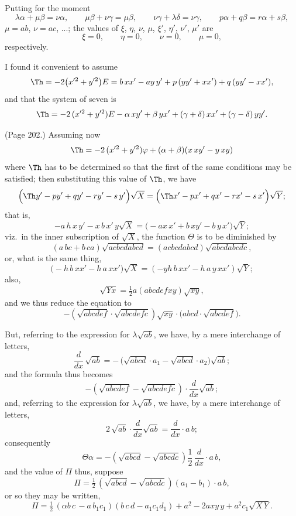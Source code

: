 \documentclass[11pt,a4paper]{book}
\begin{document}
Putting for the moment
\[
\lambda \alpha + \mu \beta = \nu \alpha, \qquad \mu \beta + \nu \gamma = \mu \beta, \qquad \nu \gamma + \lambda \delta = \nu \gamma, \qquad p \alpha + q \beta = r \alpha + s \beta,
\]
$\mu = ab$, $\nu = ac$, ...; the values of $\xi$, $\eta$, $\nu$, $\mu$, $\xi'$, $\eta'$, $\nu'$, $\mu'$ are
\[
\xi = 0, \qquad \eta = 0, \qquad \nu = 0, \qquad \mu = 0,
\]
respectively.

I found it convenient to assume
\[
\Th = -2 \big(x'^2 + y'^2 \big)E = b\,xx' - ay\,y' + p\,(yy' + xx') + q\,(yy' - xx'),
\]
and that the system of seven is
\[
\Th = -2\,(x'^2 + y'^2)E - \alpha\,xy' + \beta\,yx' + (\gamma + \delta)\,xx' + (\gamma - \delta)\,yy'.
\]

\medskip

\noindent (Page 202.) Assuming now
\[
\Th = -2\,(x'^2 + y'^2) \varphi + (\alpha + \beta) (x\,xy' - y\,xy)
\]
where $\Th$ has to be determined so that the first of the same conditions may be satisfied; then substituting this value of $\Th$, we have
\[
\Big(\Th y' - p y' + q y' - r y' - s\, y'\Big) \sqrt{X} = \Big(\Th x' - p x' + q x' - r x' - s\, x'\Big) \sqrt{Y};
\]
that is,
\[
- a\, h\, x\,y' - x\,b\,x'\,y\sqrt{X} = \Big( - a x\, x' + b\,x y' - b\,y\,x'\Big)\sqrt{Y};
\]
viz.\ in the inner subscription of $\sqrt{X}$, the function $\Theta$ is to be diminished by
\[
(a\,bc + b\,ca) \sqrt{a c b c d a b c d} = (a c b c d a b c d) \sqrt{a b c d a b c d c},
\]
or, what is the same thing,
\[
\Big( - h\, b\,x x' - h\,a\,x x'\Big) \sqrt{X} = (-y h\,b\,x x' - h\,a\,y\,x x') \sqrt{Y};
\]
also,
\[
\sqrt{Y x} = \tfrac{1}{2} a (a b c d e f x y) \sqrt{x y},
\]
and we thus reduce the equation to
\[
- ( \sqrt{a b c d e f} \cdot \sqrt{a b c d e f c}) \sqrt{x y} \cdot \big( a b c d \cdot \sqrt{a b c d e f}\big).
\]

But, referring to the expression for $\lambda \sqrt{a b}$, we have, by a mere interchange of letters,
\[
\frac{d}{d x}\, \sqrt{a b} = -\, \big(\sqrt{a b c d} \cdot a_1 - \sqrt{a b c d} \cdot a_2\big) \sqrt{a b};
\]
and the formula thus becomes
\[
- ( \sqrt{a b c d e f} - \sqrt{a b c d e f c}) \cdot \frac{d}{d x} \sqrt{a b};
\]
and, referring to the expression for $\lambda \sqrt{a b}$, we have, by a mere interchange of letters,
\[
2\, \sqrt{a b} \cdot \frac{d}{d x} \sqrt{a b} = \frac{d}{d x} \cdot a\,b;
\]
consequently
\[
\Theta \alpha = - ( \sqrt{a b c d} - \sqrt{a b c d c}) \frac{1}{2}\,\frac{d}{d x} \cdot a\,b,
\]
and the value of $\Pi$ thus, suppose
\[
\Pi = \tfrac{1}{2}\,(\sqrt{a b c d} - \sqrt{a b c d c})(a_1 - b_1) \cdot a\,b,
\]
or so they may be written,
\[
\Pi = \tfrac{1}{2}\,(\alpha b\,c\, - a\,b_1 c_1) (b\,c\,d - a_1 c_1 d_1) + a^2 - 2 a x y\,y + a^2 c_1\sqrt{X\,Y}.
\]
\end{document}
